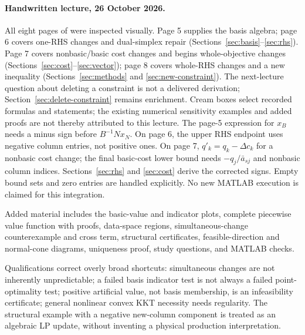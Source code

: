 \documentclass[11pt,a4paper]{article}
\begin{document}
{  \paragraph{Handwritten lecture, 26 October 2026.}
  All eight pages of  were
  inspected visually. Page 5 supplies the basis algebra; page 6 covers one-RHS
  changes and dual-simplex repair (Sections~\ref{sec:basis}--\ref{sec:rhs}).
  Page 7 covers nonbasic/basic cost changes and begins whole-objective changes
  (Sections~\ref{sec:cost}--\ref{sec:vector}); page 8 covers whole-RHS changes
  and a new inequality (Sections~\ref{sec:methods} and \ref{sec:new-constraint}).
  The next-lecture question about deleting a constraint is not a delivered
  derivation; Section~\ref{sec:delete-constraint} remains enrichment.
  Cream boxes select recorded formulas and statements; the existing numerical
  sensitivity examples and added proofs are not thereby attributed to this lecture.
  The page-5 expression for $x_B$ needs a minus sign before $B^{-1}Nx_N$.
  On page 6, the upper RHS endpoint uses negative column entries, not positive
  ones. On page 7, $q'_k=q_k-\Delta c_k$ for a nonbasic cost change; the
  final basic-cost lower bound needs $-q_j/\bar a_{sj}$ and nonbasic column
  indices. Sections~\ref{sec:rhs} and \ref{sec:cost} derive the corrected signs.
  Empty bound sets and zero entries are handled explicitly. No new MATLAB
  execution is claimed for this integration.

  Added material includes the basic-value and indicator plots, complete piecewise
  value function with proofs, data-space regions, simultaneous-change
  counterexample and cross term, structural certificates, feasible-direction
  and normal-cone diagrams, uniqueness proof, study questions, and MATLAB checks.

  Qualifications correct overly broad shortcuts: simultaneous changes are not
  inherently unpredictable; a failed basis indicator test is not always a failed
  point-optimality test; positive artificial value, not basis membership, is an
  infeasibility certificate; general nonlinear convex KKT necessity needs regularity.
  The structural example with a negative new-column component is treated as an
  algebraic LP update, without inventing a physical production interpretation.

}
\end{document}
